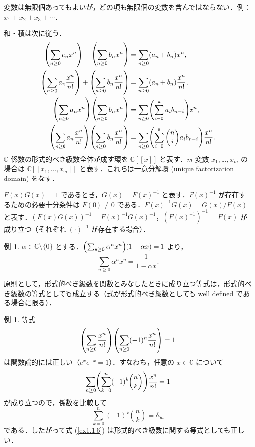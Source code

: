 \documentclass[xelatex,ja=standard,a4paper,14pt]{bxjsarticle}
\newcommand{\bbC}{\mathbb{C}}
\newcommand{\paren}[1]{\mleft(#1\mright)}
\theoremstyle{definition}
\newtheorem{example}[theorem]{例}
\begin{document}
変数は無限個あってもよいが，どの項も無限個の変数を含んではならない．例：$x_1+x_2+x_3+\cdots$．

和・積は次に従う． \begin{align*}
    \paren{\sum_{n \geq 0} a_n x^n} + \paren{\sum_{n \geq 0} b_n x^n}
     & = \sum_{n \geq 0} (a_n + b_n) x^n,                                              \\
    \paren{\sum_{n \geq 0} a_n \frac{x^n}{n!}} + \paren{\sum_{n \geq 0} b_n \frac{x^n}{n!}}
     & = \sum_{n \geq 0} (a_n + b_n) \frac{x^n}{n!},                                   \\
    \paren{\sum_{n \geq 0} a_n x^n} \paren{\sum_{n \geq 0} b_n x^n}
     & = \sum_{n \geq 0} \paren{\sum_{i=0}^n a_i b_{n-i}} x^n,                         \\
    \paren{\sum_{n \geq 0} a_n \frac{x^n}{n!}} \paren{\sum_{n \geq 0} b_n \frac{x^n}{n!}}
     & = \sum_{n \geq 0} \paren{\sum_{i=0}^n \binom{n}{i} a_i b_{n-i}} \frac{x^n}{n!}.
\end{align*}
$\bbC$ 係数の形式的べき級数全体が成す環を $\bbC[[x]]$ と表す．$m$ 変数 $x_1,\ldots,x_m$ の場合は $\bbC[[x_1,\ldots,x_m]]$ と表す．これらは一意分解環 (unique factorization domain) をなす．

$F(x) G(x) = 1$ であるとき，$G(x) = F(x)^{-1}$ と表す．$F(x)^{-1}$ が存在するための必要十分条件は $F(0) \neq 0$ である．$F(x)^{-1} G(x) = G(x) / F(x)$ と表す．$(F(x)G(x))^{-1} = F(x)^{-1} G(x)^{-1}$，$(F(x)^{-1})^{-1} = F(x)$ が成り立つ（それぞれ $(\cdot)^{-1}$ が存在する場合）．

\setcounter{theorem}{4}
\begin{example}
    $\alpha \in \bbC \setminus \{0\}$ とする．$\paren{\sum_{n \geq 0} \alpha^n x^n}(1 - \alpha x) = 1$ より， \begin{equation*}
        \sum_{n \geq 0} \alpha^n x^n = \frac{1}{1 - \alpha x}.
    \end{equation*}
\end{example}

原則として，形式的べき級数を関数とみなしたときに成り立つ等式は，形式的べき級数の等式としても成立する（式が形式的べき級数としても well defined である場合に限る）．

\begin{example}
    等式 \begin{equation} \label{ex1.1.6}
        \paren{\sum_{n \geq 0} \frac{x^n}{n!}} \paren{\sum_{n \geq 0} (-1)^n \frac{x^n}{n!}} = 1
    \end{equation}
    は関数論的には正しい（$e^x e^{-x} = 1$）．すなわち，任意の $x \in \bbC$ について \begin{equation*}
        \sum_{n \geq 0} \paren{\sum_{k=0}^n (-1)^k \binom{n}{k}} \frac{x^n}{n!} = 1
    \end{equation*}
    が成り立つので，係数を比較して \begin{equation*}
        \sum_{k=0}^n (-1)^k \binom{n}{k} = \delta_{0n}
    \end{equation*}
    である．したがって式 (\ref{ex1.1.6}) は形式的べき級数に関する等式としても正しい．
\end{example}
\end{document}
